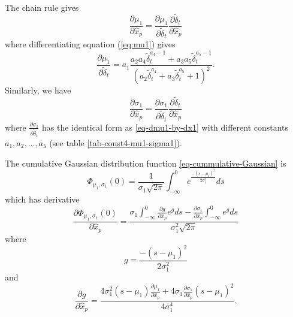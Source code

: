 \documentclass[extra, onecolumn, doublespacing]{gji}
\begin{document}
The chain rule gives
\begin{equation}
\frac{\partial \mu_1}{\partial \hat{x}_p} = \frac{\partial \mu_1}{\partial \widetilde{\delta}_t} \frac{\partial \widetilde{\delta}_t}{\partial \hat{x}_p}
\end{equation}
where differentiating equation (\ref{eq:mu1}) gives
\begin{equation}
\label{eq-dmu1-by-dx1}
\frac{\partial \mu_1}{\partial \widetilde{\delta}_t} = a_1 \frac{a_2 a_4 \widetilde{\delta}_t^{a_4-1} +a_3 a_5 \widetilde{\delta}_t^{a_5-1}}
{\left(a_2 \widetilde{\delta}_t^{a_4} +a_3 \widetilde{\delta}_t^{a_5} +1 \right)^2}.
\end{equation}
Similarly, we have
\begin{equation}
\frac{\partial \sigma_1}{\partial \hat{x}_p} = \frac{\partial \sigma_1}{\partial \widetilde{\delta}_t} \frac{\partial \widetilde{\delta}_t}
{\partial \hat{x}_p}
\end{equation}
where $\frac{\partial \sigma_1}{\partial \widetilde{\delta}_t}$ has the identical form as \ref{eq-dmu1-by-dx1} with different constants
$a_1,a_2,...,a_5$ (see table \ref{tab-const4-mu1-sigma1}).

The cumulative Gaussian distribution function \ref{eq-cummulative-Gaussian} is
\begin{equation}
\Phi_{\mu_1,\sigma_1}(0) = \frac{1}{\sigma_1 \sqrt{2 \pi}}
\int_{-\infty}^0 e^{  \frac{-(s-\mu_1)^2}{2\sigma_1^2}  } ds
\end{equation}
which has derivative
\begin{equation}
\frac{\partial \Phi_{\mu_1,\sigma_1}(0)}{\partial \hat{x}_p} =
\frac{ \sigma_1 \int_{-\infty}^0 \frac{\partial g}{\partial \hat{x}_p} e^g ds -
\frac{\partial \sigma_1}{\partial \hat{x}_p} \int_{-\infty}^0 e^g ds}
{\sigma_1^2 \sqrt{2 \pi}}
\end{equation}
where
\begin{equation}
g = \frac{-(s-\mu_1)^2}{2 \sigma_1^2}
\end{equation}
and
\begin{equation}
\frac{\partial g}{\partial \hat{x}_p} = \frac{4 \sigma_1^2 (s-\mu_1) \frac{\partial \mu_1}{\partial \hat{x}_p}
+ 4\sigma_1 \frac{\partial \sigma_1}{\partial \hat{x}_p}(s-\mu_1)^2}
{4 \sigma_1^4}.
\end{equation}
\end{document}
